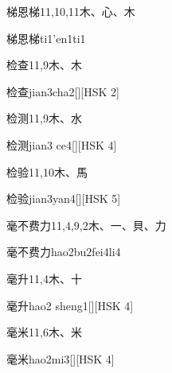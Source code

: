 \begin{entry}{梯恩梯}{11,10,11}{⽊、⼼、⽊}
  \begin{phonetics}{梯恩梯}{ti1'en1ti1}
  \end{phonetics}
\end{entry}

\begin{entry}{检查}{11,9}{⽊、⽊}
  \begin{phonetics}{检查}{jian3cha2}[][HSK 2]
  \end{phonetics}
\end{entry}

\begin{entry}{检测}{11,9}{⽊、⽔}
  \begin{phonetics}{检测}{jian3 ce4}[][HSK 4]
  \end{phonetics}
\end{entry}

\begin{entry}{检验}{11,10}{⽊、⾺}
  \begin{phonetics}{检验}{jian3yan4}[][HSK 5]
  \end{phonetics}
\end{entry}

\begin{entry}{毫不费力}{11,4,9,2}{⽊、⼀、⾙、⼒}
  \begin{phonetics}{毫不费力}{hao2bu2fei4li4}
  \end{phonetics}
\end{entry}

\begin{entry}{毫升}{11,4}{⽊、⼗}
  \begin{phonetics}{毫升}{hao2 sheng1}[][HSK 4]
  \end{phonetics}
\end{entry}

\begin{entry}{毫米}{11,6}{⽊、⽶}
  \begin{phonetics}{毫米}{hao2mi3}[][HSK 4]
  \end{phonetics}
\end{entry}

